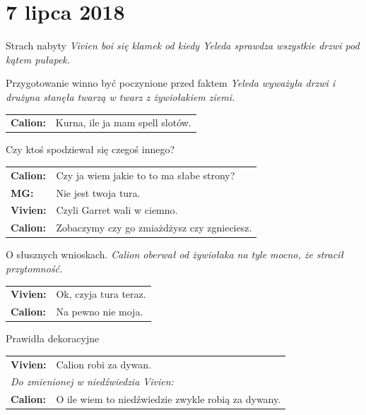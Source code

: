 \documentclass[10pt,twoside,twocolumn]{book}
\begin{document}
\section{7 lipca 2018}


\begin{rpg-quotebox}{Strach nabyty}
   \textit{Vivien boi się klamek od kiedy Yeleda sprawdza wszystkie drzwi pod kątem pułapek.}\\
\end{rpg-quotebox}


\begin{rpg-quotebox}{Przygotowanie winno być poczynione przed faktem}
   \textit{Yeleda wyważyła drzwi i drużyna stanęła twarzą w twarz z żywiołakiem ziemi.}\\

   \begin{tabularx}{\columnwidth}{lX}
      \textbf{Calion:} & Kurna, ile ja mam spell slotów.\\
   \end{tabularx}
\end{rpg-quotebox}


\begin{rpg-quotebox}{Czy ktoś spodziewał się czegoś innego?}
   \begin{tabularx}{\columnwidth}{lX}
      \textbf{Calion:} & Czy ja wiem jakie to to ma słabe strony?\\
      \textbf{MG:} & Nie jest twoja tura.\\
      \textbf{Vivien:} & Czyli Garret wali w ciemno.\\
      \textbf{Calion:} & Zobaczymy czy go zmiażdżysz czy zgnieciesz.\\
   \end{tabularx}
\end{rpg-quotebox}


\begin{rpg-quotebox}{O słusznych wnioskach.}
   \textit{Calion oberwał od żywiołaka na tyle mocno, że stracił przytomność.}\\

   \begin{tabularx}{\columnwidth}{lX}
      \textbf{Vivien:} & Ok, czyja tura teraz.\\
      \textbf{Calion:} & Na pewno nie moja.\\
   \end{tabularx}
\end{rpg-quotebox}


\begin{rpg-quotebox}{Prawidła dekoracyjne}
   \begin{tabularx}{\columnwidth}{lX}
      \textbf{Vivien:} & Calion robi za dywan.\\
      \multicolumn{2}{l}{\textit{Do zmienionej w niedźwiedzia Vivien:}}\\
      \textbf{Calion:} & O ile wiem to niedźwiedzie zwykle robią za dywany.\\
   \end{tabularx}
\end{rpg-quotebox}
\end{document}
